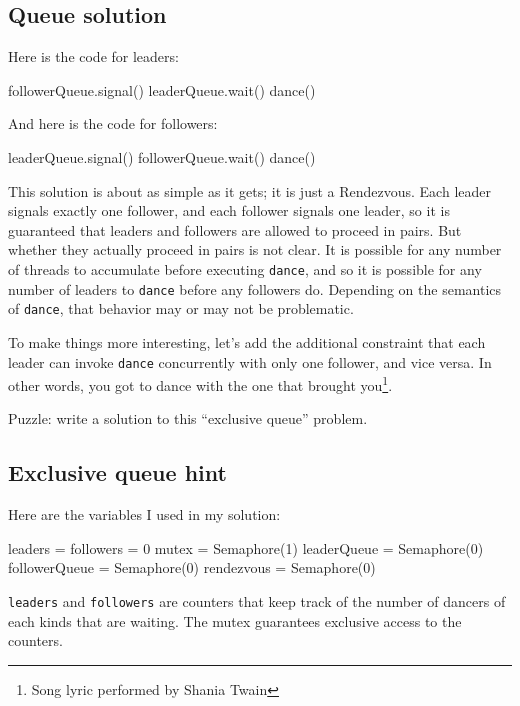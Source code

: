 \documentclass{book}
\begin{document}
\subsection {Queue solution}

Here is the code for leaders:

\begin{unbreakable}[title={Queue solution (leaders)}]{}
followerQueue.signal()
leaderQueue.wait()
dance()
\end{unbreakable}

And here is the code for followers:

\begin{unbreakable}[title={Queue solution (followers)}]{}
leaderQueue.signal()
followerQueue.wait()
dance()
\end{unbreakable}

This solution is about as simple as it gets; it is just a Rendezvous.
Each leader signals exactly one follower, and each follower signals
one leader, so it is guaranteed that leaders and followers are
allowed to proceed in pairs.  But whether they actually proceed in
pairs is not clear.  It is possible for any number of threads to
accumulate before executing {\tt dance}, and so it is possible for
any number of leaders to {\tt dance} before any followers do.
Depending on the semantics of {\tt dance}, that behavior may or
may not be problematic.

To make things more interesting, let's add the additional constraint
that each leader can invoke {\tt dance} concurrently with only
one follower, and vice versa.  In other words, you got to dance
with the one that brought you\footnote{Song lyric performed by Shania
    Twain}.

Puzzle: write a solution to this ``exclusive queue'' problem.



\subsection {Exclusive queue hint}

Here are the variables I used in my solution:

\begin{unbreakable}[title={Queue hint}]{}
leaders = followers = 0
mutex = Semaphore(1)
leaderQueue = Semaphore(0)
followerQueue = Semaphore(0)
rendezvous = Semaphore(0)
\end{unbreakable}

{\tt leaders} and {\tt followers} are counters that
keep track of the number of dancers of each kinds that are
waiting.  The mutex guarantees exclusive access to the counters.
\end{document}
